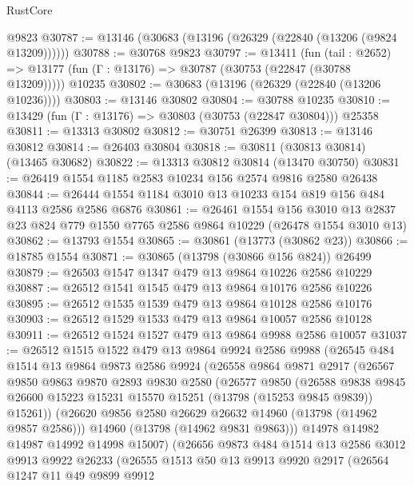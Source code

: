 \begin{lexlean}{RustCore}
\begin{coremodule}
    @9823
@30787 := @13146 (@30683 (@13196 (@26329 (@22840 (@13206 (@9824 @13209))))))
@30788 := @30768 @9823
@30797 := @13411
    (fun (tail : @2652) => @13177 (fun (Γ : @13176) => @30787 (@30753 (@22847 (@30788 @13209)))))
    @10235
@30802 := @30683 (@13196 (@26329 (@22840 (@13206 @10236))))
@30803 := @13146 @30802
@30804 := @30788 @10235
@30810 := @13429 (fun (Γ : @13176) => @30803 (@30753 (@22847 @30804))) @25358
@30811 := @13313 @30802
@30812 := @30751 @26399
@30813 := @13146 @30812
@30814 := @26403 @30804
@30818 := @30811 (@30813 @30814) (@13465 @30682)
@30822 := @13313 @30812 @30814 (@13470 @30750)
@30831 := @26419 @1554 @1185 @2583 @10234 @156 @2574 @9816 @2580 @26438
@30844 := @26444 @1554 @1184 @3010 @13 @10233 @154 @819 @156 @484 @4113 @2586 @2586 @6876
@30861 := @26461
    @1554
    @156
    @3010
    @13
    @2837
    @23
    @824
    @779
    @1550
    @7765
    @2586
    @9864
    @10229
    (@26478 @1554 @3010 @13)
@30862 := @13793 @1554
@30865 := @30861 (@13773 (@30862 @23))
@30866 := @18785 @1554
@30871 := @30865 (@13798 (@30866 @156 @824)) @26499
@30879 := @26503 @1547 @1347 @479 @13 @9864 @10226 @2586 @10229
@30887 := @26512 @1541 @1545 @479 @13 @9864 @10176 @2586 @10226
@30895 := @26512 @1535 @1539 @479 @13 @9864 @10128 @2586 @10176
@30903 := @26512 @1529 @1533 @479 @13 @9864 @10057 @2586 @10128
@30911 := @26512 @1524 @1527 @479 @13 @9864 @9988 @2586 @10057
@31037 := @26512
    @1515
    @1522
    @479
    @13
    @9864
    @9924
    @2586
    @9988
    (@26545
      @484
      @1514
      @13
      @9864
      @9873
      @2586
      @9924
      (@26558
        @9864
        @9871
        @2917
        (@26567
          @9850
          @9863
          @9870
          @2893
          @9830
          @2580
          (@26577
            @9850
            (@26588
              @9838
              @9845
              @26600
              @15223
              @15231
              @15570
              @15251
              (@13798 (@15253 @9845 @9839))
              @15261))
          (@26620 @9856 @2580 @26629 @26632 @14960 (@13798 (@14962 @9857 @2586)))
          @14960
          (@13798 (@14962 @9831 @9863)))
        @14978
        @14982
        @14987
        @14992
        @14998
        @15007)
      (@26656
        @9873
        @484
        @1514
        @13
        @2586
        @3012
        @9913
        @9922
        @26233
        (@26555
          @1513
          @50
          @13
          @9913
          @9920
          @2917
          (@26564
            @1247
            @11
            @49
            @9899
            @9912

\end{coremodule}
\end{lexlean}
